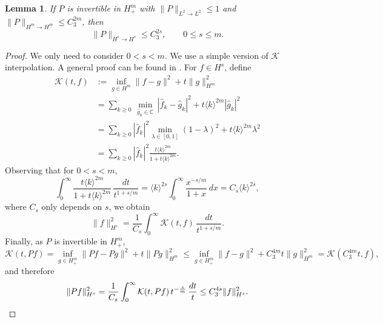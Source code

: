 \documentclass [11pt] {article}
\newtheorem{lem}[thm]{Lemma}
\begin{document}
\begin{lem}
\label{lem:interpolation}
If $P$ is invertible in $H^m_+$ with $\|P\|_{L^2\to L^2}\leq 1$ and $\|P\|_{H^m\to H^m}\leq C_3^{2m}$, then
\[
\|P\|_{H^s\to H^s}\leq C_3^{2s}, \qquad 0 \le s \le m.
\]
\end{lem}
\begin{proof}
We only need to consider $0<s<m$. We use a simple version of $\mathcal{K}$ interpolation. A general proof can be found in \cite[Theorem~7.23]{AF03}. For $f\in H^s$, define
\begin{align*}
\mathcal{K}(t,f)&:=\inf_{g\in H^m}\|f-g\|^2+t\|g\|_{H^m}^2\\
&=\sum_{k\geq 0}\,\min_{\widehat g_k\in \mathbb C}\,|\widehat f_k- \widehat g_k|^2+t\langle k\rangle^{2m}|\widehat g_k|^2\\
&=\sum_{k\geq 0}|\widehat f_k|^2\min_{\lambda\in [0,1]}(1-\lambda)^2+t\langle k\rangle^{2m}\lambda^2\\
&=\sum_{k\geq 0}|\widehat f_k|^2\frac{t\langle k\rangle^{2m}}{1+t\langle k\rangle^{2m}}.
\end{align*}
Observing that for $0<s<m$,
\[
\int_0^\infty \frac{t\langle k\rangle^{2m}}{1+t\langle k\rangle^{2m}} \,\frac{dt}{t^{1+s/m}}=\langle k\rangle^{2s}\int_0^\infty \frac{x^{-s/m}}{1+x} \,dx=C_s\langle k\rangle^{2s},
\]
where $C_s$ only depends on $s$, we obtain
\[
\|f\|_{H^s}^2=\frac{1}{C_s}\int_0^\infty \mathcal{K}(t,f) \,\frac{dt}{t^{1+s/m}}.
\]
Finally, as $P$ is invertible in $H^m_+$,
\[
\mathcal{K}(t,Pf)=\inf_{g\in H^m_+}\|Pf-Pg\|^2+t\|Pg\|_{H^m}^2\leq \inf_{g\in H^m_+}\|f-g\|^2+C_3^{4m}t\|g\|_{H^m}^2= \mathcal{K}(C_3^{4m}t,f),
\]
and therefore
\[
\|Pf\|_{H^s}^2=\frac{1}{C_s}\int_0^\infty \mathcal{K}(t,Pf) \,t^{-\frac{s}{m}}\,\frac{dt}{t}\leq C_3^{4s}\|f\|_{H^s}^2.\qedhere
\]
\end{proof}
\end{document}
